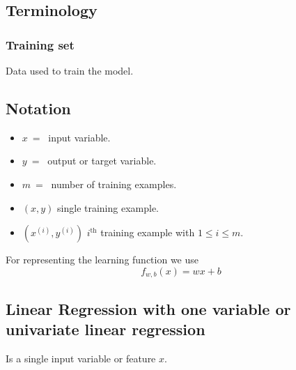 \documentclass[a4paper]{article}
\begin{document}
\subsection{Terminology}
\subsubsection{Training set}
\noindent
Data used to train the model.
\subsection{Notation}
\noindent
\begin{itemize}
    \item \(x \ = \ \) input variable.
    \item \(y \ = \ \) output or target variable. 
    \item \(m \ = \ \) number of training examples.
    \item \((x, y)\) single training example.
    \item \((x^{(i)}, y^{(i)})\) \(i^{\text{th}}\) training example with \(1 \leq i \leq m\). 
\end{itemize}
For representing the learning function we use
\[
    f_{w,b}\left(x\right) = wx + b  
\]
\subsection{Linear Regression with one variable or univariate linear regression}
\noindent
Is a single input variable or feature \(x\).
\end{document}
